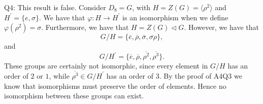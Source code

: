 \documentclass[letterpaper]{article}
\newcommand{\lan}{\langle}
\newcommand{\ran}{\rangle}
\newcommand{\inn}[1]{\lan#1\ran}
\newcommand{\ol}{\overline}
\begin{document}
\noindent Q4: 
This result is false. Consider $D_8 = G$, with $H = Z(G) = \inn{\rho^2}$ and $H^\prime = \{e,\sigma\}$. We have that $\varphi: H \to H^\prime$ is an isomorphism when we define $\varphi(\rho^2) = \sigma$. Furthermore, we have that $H = Z(G) \triangleleft G$. However, we have that $$G / H  = \{\ol{e}, \ol{\rho}, \ol{\sigma}, \ol{\sigma \rho} \}, $$ and $$G / H^\prime = \{\ol{e}, \ol{\rho}, \ol{\rho^2}, \ol{\rho^3}  \}. $$
These groups are certainly not isomorphic, since every element in $G/ H$ has an order of $2$ or $1$, while $\ol{\rho^3} \in G / H^\prime$ has an order of $3$. By the proof of A4Q3 we know that isomorphisms must preserve the order of elements. Hence no isomorphism between these groups can exist. 
\end{document}
